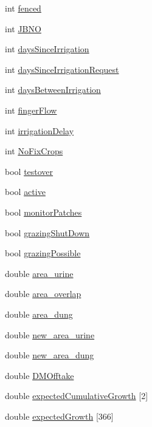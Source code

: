 \begin{DoxyCompactItemize}
\item 
int \hyperlink{classfield_af2d4002c30bf188d089dbe1d33a0b784}{fenced}
\item 
int \hyperlink{classfield_ae283dc67495fb9dd0056d9a88b6f69c1}{JBNO}
\item 
int \hyperlink{classfield_acfff5382da945e06998c1f1c73b516e9}{daysSinceIrrigation}
\item 
int \hyperlink{classfield_aa279abd93bccb07f247dbc84f4320d94}{daysSinceIrrigationRequest}
\item 
int \hyperlink{classfield_ab9cb5bab1f200cff668744cbf39c3a71}{daysBetweenIrrigation}
\item 
int \hyperlink{classfield_a5a67b4783694d4ba4cf87270306b910b}{fingerFlow}
\item 
int \hyperlink{classfield_a44f394bfa9a2924bde0653645b5a3182}{irrigationDelay}
\item 
int \hyperlink{classfield_a07969cf234c23a6f05d6a2f81b424917}{NoFixCrops}
\item 
bool \hyperlink{classfield_a996fdf906e65192c69c7ab58bd47cd30}{testover}
\item 
bool \hyperlink{classfield_adf9545309af5dd5c46b1059e66abe714}{active}
\item 
bool \hyperlink{classfield_a70e2c5be4735304e735cd79230e0fe5a}{monitorPatches}
\item 
bool \hyperlink{classfield_a290e1b803f7299cb7cf7054ef02027e3}{grazingShutDown}
\item 
bool \hyperlink{classfield_a3af1a5461fe52c5fb81cc339809666b9}{grazingPossible}
\item 
double \hyperlink{classfield_abd96c9e9d47349a3faaed79c4a85f894}{area\_\-urine}
\item 
double \hyperlink{classfield_a9c28012934fefe1cdbb10f3d680f7f87}{area\_\-overlap}
\item 
double \hyperlink{classfield_aa436f3310aeaf096dfa3a03a8fcc632a}{area\_\-dung}
\item 
double \hyperlink{classfield_a1403303f06e0e2d83fc68543bea2f2ed}{new\_\-area\_\-urine}
\item 
double \hyperlink{classfield_a1183441459b4c65b13dfaf43001bf892}{new\_\-area\_\-dung}
\item 
double \hyperlink{classfield_a99af7d28a2e26d37e1e6fc170bb7c416}{DMOfftake}
\item 
double \hyperlink{classfield_a54956ebaa2b763b10fbcc7cf81e1d27d}{expectedCumulativeGrowth} \mbox{[}2\mbox{]}
\item 
double \hyperlink{classfield_ab34c30afdf90e35b899c7a4120db6566}{expectedGrowth} \mbox{[}366\mbox{]}

\end{DoxyCompactItemize}
